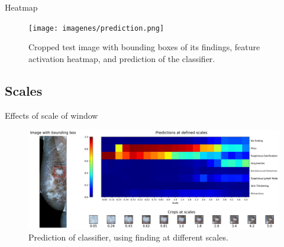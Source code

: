\begin{frame}{Heatmap}
    \begin{figure}
        \centering
        \texttt{[image: imagenes/prediction.png]}
        \caption{Cropped test image with bounding boxes of its findings, feature activation heatmap, and prediction of the classifier.}
    \end{figure}
\end{frame}

\subsection{Scales}
\begin{frame}{Effects of scale of window}
    \begin{figure}
        \centering
        \includegraphics[height=0.7\textheight,keepaspectratio]{imagenes/ratios.png}
        \caption{Prediction of classifier, using finding at different scales.}
    \end{figure}
    
\end{frame}